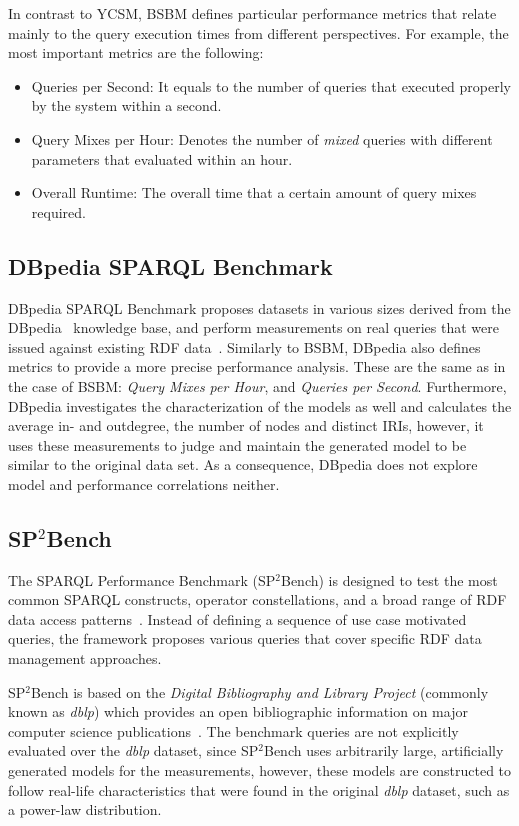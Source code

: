 In contrast to YCSM, BSBM defines particular performance metrics that relate mainly to the query execution times from different perspectives. For example, the most important metrics are the following:
\begin{itemize}
	\item{Queries per Second}: It equals to the number of queries that executed properly by the system within a second.
	\item{Query Mixes per Hour}: Denotes the number of \textit{mixed} queries with different parameters that evaluated within an hour.
	\item{Overall Runtime}: The overall time that a certain amount of query mixes required.
\end{itemize}


\subsection{DBpedia SPARQL Benchmark}
DBpedia SPARQL Benchmark proposes datasets in various sizes derived from the DBpedia~\cite{dbpedia_data} knowledge base, and perform measurements on real queries that were issued against existing RDF data~\cite{dbpedia}. Similarly to BSBM, DBpedia also defines metrics to provide a more precise performance analysis. These are the same as in the case of BSBM: \textit{Query Mixes per Hour}, and \textit{Queries per Second}. Furthermore, DBpedia investigates the characterization of the models as well and calculates the average in- and outdegree, the number of nodes and distinct IRIs, however, it uses these measurements to judge and maintain the generated model to be similar to the original data set. As a consequence, DBpedia does not explore model and performance correlations neither.

\subsection{SP$^2$Bench}
The SPARQL Performance Benchmark (SP$^2$Bench) is designed to test the most common SPARQL constructs,
operator constellations, and a broad range of RDF data access patterns~\cite{sp2bench}. Instead of defining a sequence of use case motivated queries, the framework proposes various queries that cover specific RDF data management approaches.

SP$^2$Bench is based on the \textit{Digital Bibliography and Library Project} (commonly known as \textit{dblp}) which provides an open bibliographic information on major computer science publications~\cite{dblp}. The benchmark queries are not explicitly evaluated over the \textit{dblp} dataset, since SP$^2$Bench uses arbitrarily large, artificially generated models for the measurements, however, these models are constructed to follow real-life characteristics that were found in the original \textit{dblp} dataset, such as a power-law distribution.

